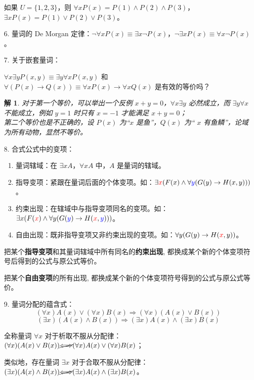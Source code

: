 \documentclass[normal,cyan]{elegantnote}
\newtheorem{solve}{解}
\begin{document}
如果 $U = \{1, 2, 3\}$，则 $\forall xP(x) = P(1)\wedge P(2) \wedge P(3)$，$\exists xP(x) = P(1) \vee P(2) \vee P(3)$。

6. 量词的 De Morgan 定律：$\neg \forall xP(x) \equiv \exists x\neg P(x)$，$\neg \exists xP(x) \equiv \forall x\neg P(x)$。

7. 关于嵌套量词：
\begin{example}
    $\forall x \exists yP(x, y) \equiv \exists y \forall xP(x, y)$ 和 $\forall (P(x) \to Q(x)) \equiv \forall xP(x) \to \forall xQ(x)$ 是有效的等价吗？
\end{example}
\begin{solve}
    对于第一个等价，可以举出一个反例 $x + y = 0$，$\forall x \exists y$ 必然成立，而 $\exists y \forall x$ 不能成立，例如 $y = 1$ 时只有 $x = -1$ 才能满足 $x + y = 0$；\\
    第二个等价也是不正确的，设 $P(x)$ 为“$x$ 是鱼”，$Q(x)$ 为“ $x$ 有鱼鳞”，论域为所有动物，显然不等价。
\end{solve}
8. 合式公式中的变项：
\begin{enumerate}[1)]
    \item 量词辖域：在 $\exists xA$，$\forall xA$ 中，$A$ 是量词的辖域。
    \item 指导变项：紧跟在量词后面的个体变项。如：$\exists {\color{red} x}(F(x) \wedge \forall {\color{blue} y}(G(y) \to H(x, y)))$。
    \item 约束出现：在辖域中与指导变项同名的变项。如：$\exists x(F({\color{red} x}) \wedge \forall y(G({\color{blue} y}) \to H({\color{red} x}, {\color{blue} y})))$。
    \item 自由出现：既非指导变项又非约束出现的变项。如：$\forall y(G(y) \to H({\color{red} x}, y))$。
\end{enumerate}
\begin{theorem}[换名规则]
    把某个\textbf{指导变项}和其量词辖域中所有同名的\textbf{约束出现}, 都换成某个新的个体变项符号后得到的公式与原公式等价。
\end{theorem}
\begin{theorem}[代替规则]
    把某个\textbf{自由变项}的所有出现, 都换成某个新的个体变项符号得到的公式与原公式等价。
\end{theorem}
9. 量词分配的蕴含式：$$(\forall x)A(x) \vee (\forall x) B(x) \Longrightarrow (\forall x) (A(x) \vee B(x))$$ $$ (\exists x)(A(x) \wedge B(x)) \Longrightarrow (\exists x) A(x) \wedge (\exists x) B(x)$$
\begin{note}
    全称量词 $\forall x$ 对于析取不服从分配律：$(\forall x)(A(x) \vee B(x)) \cancel{\Longleftrightarrow} (\forall x)A(x) \vee (\forall x)B(x)$；

    类似地，存在量词 $\exists x$ 对于合取不服从分配律：$(\exists x)(A(x) \wedge B(x)) \cancel{\Longleftrightarrow} (\exists x) A(x) \wedge (\exists x) B(x)$。
\end{note}
\end{document}
